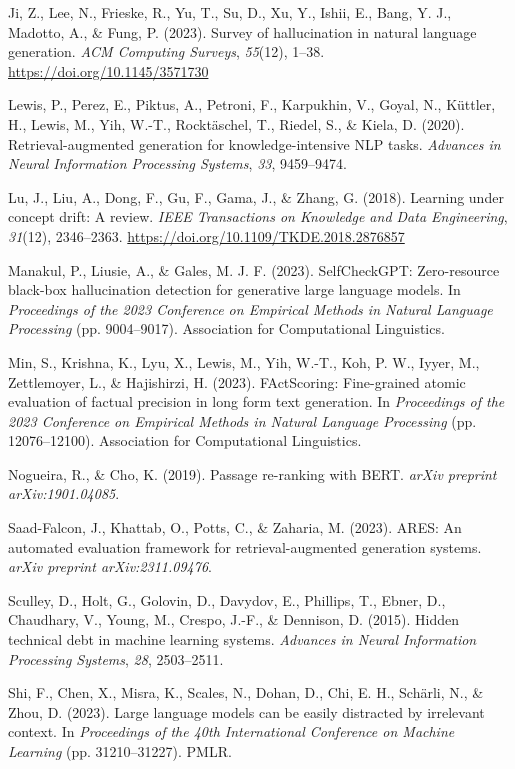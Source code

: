 \documentclass[12pt,a4paper]{report}
\begin{document}
{Ji, Z., Lee, N., Frieske, R., Yu, T., Su, D., Xu, Y., Ishii, E., Bang, Y. J., Madotto, A., \& Fung, P. (2023). Survey of hallucination in natural language generation. \textit{ACM Computing Surveys}, \textit{55}(12), 1--38. \url{https://doi.org/10.1145/3571730}

Lewis, P., Perez, E., Piktus, A., Petroni, F., Karpukhin, V., Goyal, N., K{\"u}ttler, H., Lewis, M., Yih, W.-T., Rockt{\"a}schel, T., Riedel, S., \& Kiela, D. (2020). Retrieval-augmented generation for knowledge-intensive NLP tasks. \textit{Advances in Neural Information Processing Systems}, \textit{33}, 9459--9474.

Lu, J., Liu, A., Dong, F., Gu, F., Gama, J., \& Zhang, G. (2018). Learning under concept drift: A review. \textit{IEEE Transactions on Knowledge and Data Engineering}, \textit{31}(12), 2346--2363. \url{https://doi.org/10.1109/TKDE.2018.2876857}

Manakul, P., Liusie, A., \& Gales, M. J. F. (2023). SelfCheckGPT: Zero-resource black-box hallucination detection for generative large language models. In \textit{Proceedings of the 2023 Conference on Empirical Methods in Natural Language Processing} (pp. 9004--9017). Association for Computational Linguistics.

Min, S., Krishna, K., Lyu, X., Lewis, M., Yih, W.-T., Koh, P. W., Iyyer, M., Zettlemoyer, L., \& Hajishirzi, H. (2023). FActScoring: Fine-grained atomic evaluation of factual precision in long form text generation. In \textit{Proceedings of the 2023 Conference on Empirical Methods in Natural Language Processing} (pp. 12076--12100). Association for Computational Linguistics.

Nogueira, R., \& Cho, K. (2019). Passage re-ranking with BERT. \textit{arXiv preprint arXiv:1901.04085}.

Saad-Falcon, J., Khattab, O., Potts, C., \& Zaharia, M. (2023). ARES: An automated evaluation framework for retrieval-augmented generation systems. \textit{arXiv preprint arXiv:2311.09476}.

Sculley, D., Holt, G., Golovin, D., Davydov, E., Phillips, T., Ebner, D., Chaudhary, V., Young, M., Crespo, J.-F., \& Dennison, D. (2015). Hidden technical debt in machine learning systems. \textit{Advances in Neural Information Processing Systems}, \textit{28}, 2503--2511.

Shi, F., Chen, X., Misra, K., Scales, N., Dohan, D., Chi, E. H., Sch\"{a}rli, N., \& Zhou, D. (2023). Large language models can be easily distracted by irrelevant context. In \textit{Proceedings of the 40th International Conference on Machine Learning} (pp. 31210--31227). PMLR.

}
\end{document}
